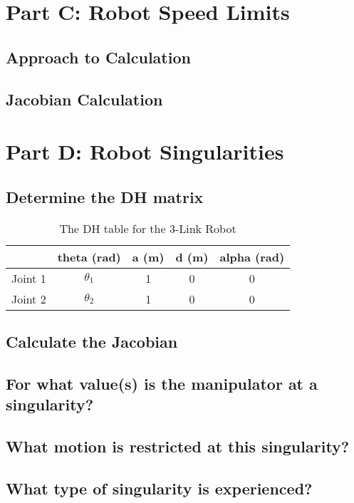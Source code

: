 \documentclass[12pt]{article}
\begin{document}
\section{Part C: Robot Speed Limits}
\subsection{Approach to Calculation}
\subsection{Jacobian Calculation}


\section{Part D: Robot Singularities}
\subsection{Determine the DH matrix}
\begin{table}[H]
    \centering
    \begin{tabular}{|c|c|c|c|c|}
        \hline
                & \textbf{theta (rad)} & \textbf{a (m)} & \textbf{d (m)} & \textbf{alpha (rad)} \\ \hline
        Joint 1 & $\theta_{1}$         & 1              & 0              & 0                    \\ \hline
        Joint 2 & $\theta_{2}$         & 1              & 0              & 0                    \\ \hline
    \end{tabular}
    \caption{The DH table for the 3-Link Robot}
    \label{table:3-Link Robot}
\end{table}
\subsection{Calculate the Jacobian}
\subsection{For what value(s) is the manipulator at a singularity?}
\subsection{What motion is restricted at this singularity?}
\subsection{What type of singularity is experienced?}
\end{document}
